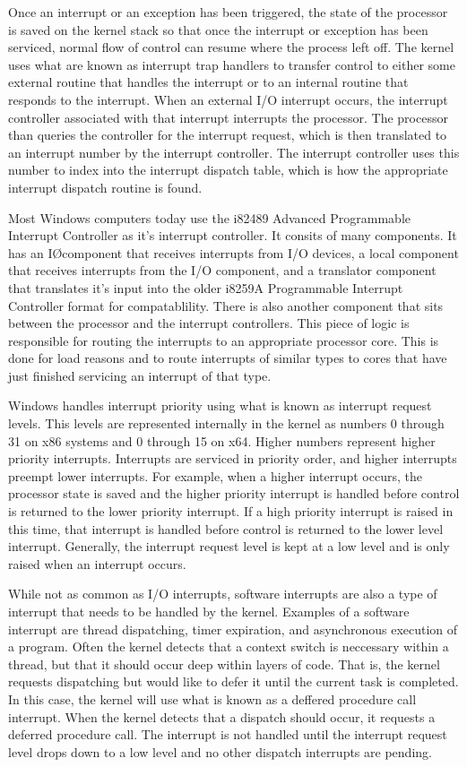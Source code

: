 \documentclass[journal,letterpaper,draftclsnofoot,onecolumn,10pt]{IEEEtran}
\begin{document}
Once an interrupt or an exception has been triggered, the state of the processor is saved on the kernel stack so that once the interrupt or exception has been serviced, normal flow of control can resume where the process left off. The kernel uses what are known as interrupt trap handlers to transfer control to either some external routine that handles the interrupt or to an internal routine that responds to the interrupt. When an external I/O interrupt occurs, the interrupt controller associated with that interrupt interrupts the processor. The processor than queries the controller for the interrupt request, which is then translated to an interrupt number by the interrupt controller. The interrupt controller uses this number to index into the interrupt dispatch table, which is how the appropriate interrupt dispatch routine is found.\cite{1ris12}

Most Windows computers today use the i82489 Advanced Programmable Interrupt Controller as it's interrupt controller. It consits of many components. It has an I\O component that receives interrupts from I/O devices, a local component that receives interrupts from the I/O component, and a translator component that translates it's input into the older i8259A Programmable Interrupt Controller format for compatablility. There is also another component that sits between the processor and the interrupt controllers. This piece of logic is responsible for routing the interrupts to an appropriate processor core. This is done for load reasons and to route interrupts of similar types to cores that have just finished servicing an interrupt of that type.\cite{1ris12}

Windows handles interrupt priority using what is known as interrupt request levels. This levels are represented internally in the kernel as numbers 0 through 31 on x86 systems and 0 through 15 on x64. Higher numbers represent higher priority interrupts. Interrupts are serviced in priority order, and higher interrupts preempt lower interrupts. For example, when a higher interrupt occurs, the processor state is saved and the higher priority interrupt is handled before control is returned to the lower priority interrupt. If a high priority interrupt is raised in this time, that interrupt is handled before control is returned to the lower level interrupt. Generally, the interrupt request level is kept at a low level and is only raised when an interrupt occurs.\cite{1ris12}

While not as common as I/O interrupts, software interrupts are also a type of interrupt that needs to be handled by the kernel. Examples of a software interrupt are thread dispatching, timer expiration, and asynchronous execution of a program. Often the kernel detects that a context switch is neccessary within a thread, but that it should occur deep within layers of code. That is, the kernel requests dispatching but would like to defer it until the current task is completed. In this case, the kernel will use what is known as a deffered procedure call interrupt. When the kernel detects that a dispatch should occur, it requests a deferred procedure call. The interrupt is not handled until the interrupt request level drops down to a low level and no other dispatch interrupts are pending.\cite{1ris12}
\end{document}
